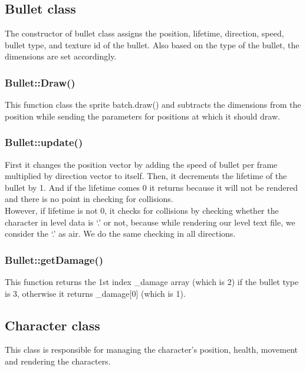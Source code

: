 \documentclass{article}
\begin{document}
\subsection{Bullet class}
The constructor of bullet class assigns the position, lifetime, direction, speed, bullet type, and texture id of the bullet. Also based on the type of the bullet, the dimensions are set accordingly.
\newline

\subsubsection{Bullet::Draw()}
This function class the sprite batch.draw() and subtracts the dimensions from the position while sending the parameters for positions at which it should draw.
 \\
 
\subsubsection{Bullet::update()}
First it changes the position vector by adding the speed of bullet per frame multiplied by direction vector to itself. Then, it decrements the lifetime of the bullet by 1. And if the lifetime comes 0 it returns because it will not be rendered and there is no point in checking for collisions.\\

However, if lifetime is not 0, it checks for collisions by checking whether the character in level data is ‘.’ or not, because while rendering our level text file, we consider the ‘.’ as air. We do the same checking in all directions. \\
\newline

\subsubsection{Bullet::getDamage()}
This function returns the 1st index \_damage array (which is 2) if the bullet type is 3, otherwise it returns \_damage[0] (which is 1).
\newline

\subsection{Character class}
This class is responsible for managing the character’s position, health, movement and rendering the characters.
 \\
 
\end{document}
